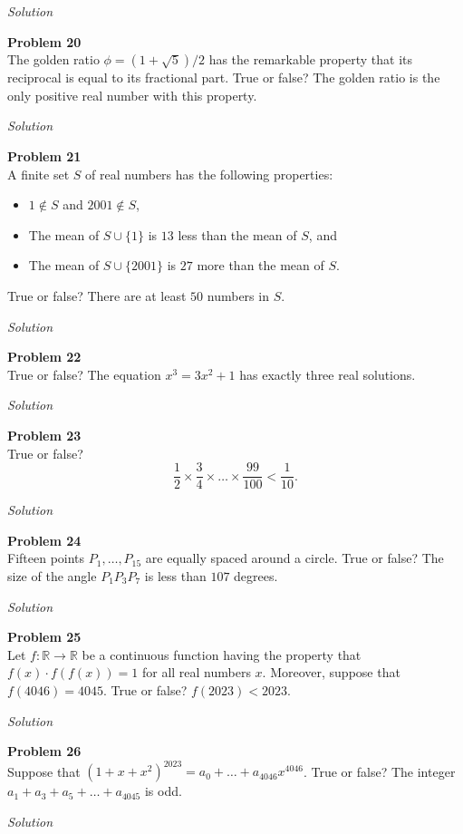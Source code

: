 \documentclass{amsart}
\begin{document}
\textit{Solution}

\textbf{Problem 20}\\
The golden ratio $\phi = (1 + \sqrt{5})/2$ has the remarkable property that its reciprocal is equal to its fractional part.
True or false? The golden ratio is the only positive real number with this property.

\textit{Solution}

\textbf{Problem 21}\\
A finite set $S$ of real numbers has the following properties:
\begin{itemize}
\item $1 \not\in S$ and $2001 \not\in S$,
\item The mean of $S \cup \{1\}$ is $13$ less than the mean of $S$, and
\item The mean of $S \cup \{2001\}$ is $27$ more than the mean of $S$.
\end{itemize}
True or false? There are at least $50$ numbers in $S$.

\textit{Solution}

\textbf{Problem 22}\\
True or false? The equation $x^3 = 3x^2 + 1$ has exactly three real solutions.

\textit{Solution}

\textbf{Problem 23}\\
True or false?
\[ \frac{1}{2} \times \frac{3}{4} \times \dots \times \frac{99}{100} < \frac{1}{10}. \]

\textit{Solution}

\textbf{Problem 24}\\
Fifteen points $P_1,\dots,P_{15}$ are equally spaced around a circle.
True or false?
The size of the angle $P_1 P_3 P_7$ is less than $107$ degrees.

\textit{Solution}

\textbf{Problem 25}\\
Let $f : \mathbb{R} \to \mathbb{R}$ be a continuous function having the property that $f(x) \cdot f(f(x)) = 1$ for all real numbers $x$.
Moreover, suppose that $f(4046) = 4045$.
True or false? $f(2023) < 2023$.

\textit{Solution}

\textbf{Problem 26}\\
Suppose that $(1 + x + x^2)^{2023} = a_0 + \dots + a_{4046}x^{4046}$.
True or false? The integer $a_1 + a_3 + a_5 + \dots + a_{4045}$ is odd.

\textit{Solution}
\end{document}

